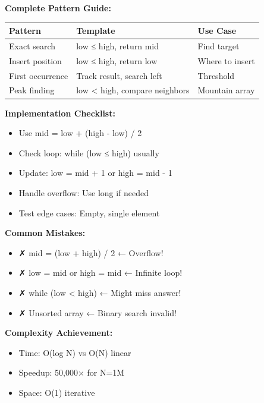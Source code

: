 \documentclass[11pt,a4paper,oneside]{book}
\begin{document}
\begin{tcolorbox}[
    enhanced,breakable,
    colback=primaryblue!10,
    colframe=primaryblue,
    boxrule=2pt,
    arc=4mm,
    title=\textbf{Binary Search: Foundation Mastery}
]
\textbf{Complete Pattern Guide:}

\begin{center}
\begin{tabular}{|l|l|l|}
\hline
\rowcolor{lightgray}
\textbf{Pattern} & \textbf{Template} & \textbf{Use Case} \\
\hline
Exact search & low ≤ high, return mid & Find target \\
\hline
Insert position & low ≤ high, return low & Where to insert \\
\hline
First occurrence & Track result, search left & Threshold \\
\hline
Peak finding & low < high, compare neighbors & Mountain array \\
\hline
\end{tabular}
\end{center}

\textbf{Implementation Checklist:}
\begin{itemize}
    \item  Use mid = low + (high - low) / 2
    \item  Check loop: while (low ≤ high) usually
    \item  Update: low = mid + 1 or high = mid - 1
    \item  Handle overflow: Use long if needed
    \item  Test edge cases: Empty, single element
\end{itemize}

\textbf{Common Mistakes:}
\begin{itemize}
    \item ✗ mid = (low + high) / 2 ← Overflow!
    \item ✗ low = mid or high = mid ← Infinite loop!
    \item ✗ while (low < high) ← Might miss answer!
    \item ✗ Unsorted array ← Binary search invalid!
\end{itemize}

\textbf{Complexity Achievement:}
\begin{itemize}
    \item Time: O(log N) vs O(N) linear
    \item Speedup: 50,000× for N=1M
    \item Space: O(1) iterative
\end{itemize}
\end{tcolorbox}
\end{document}
